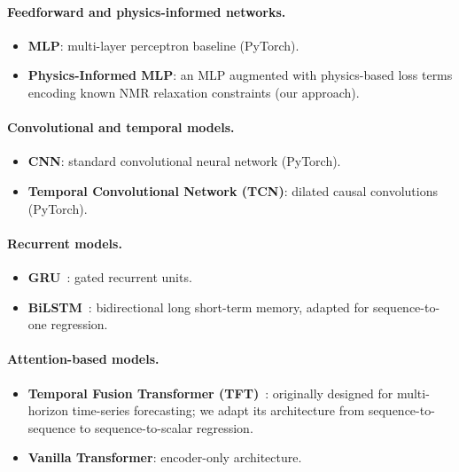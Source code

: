 \documentclass[runningheads]{llncs}
\begin{document}
\paragraph{Feedforward and physics-informed networks.}
\begin{itemize}
  \item \textbf{MLP}: multi-layer perceptron baseline (PyTorch).
  \item \textbf{Physics-Informed MLP}: an MLP augmented with physics-based loss terms
        encoding known NMR relaxation constraints (our approach).
\end{itemize}

\paragraph{Convolutional and temporal models.}
\begin{itemize}
  \item \textbf{CNN}: standard convolutional neural network (PyTorch).
  \item \textbf{Temporal Convolutional Network (TCN)}: dilated causal convolutions (PyTorch).
\end{itemize}

\paragraph{Recurrent models.}
\begin{itemize}
  \item \textbf{GRU}~\cite{ref_gru}: gated recurrent units.
  \item \textbf{BiLSTM}~\cite{ref_bilstm}: bidirectional long short-term memory, adapted
        for sequence-to-one regression.
\end{itemize}

\paragraph{Attention-based models.}
\begin{itemize}
  \item \textbf{Temporal Fusion Transformer (TFT)}~\cite{ref_tft}: originally designed for
        multi-horizon time-series forecasting; we adapt its architecture from sequence-to-sequence
        to sequence-to-scalar regression.
  \item \textbf{Vanilla Transformer}: encoder-only architecture.
\end{itemize}
\end{document}

